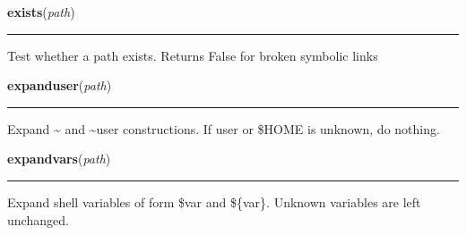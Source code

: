     \label{genericpath:exists}

    \vspace{0.5ex}

\hspace{.8\funcindent}\begin{boxedminipage}{\funcwidth}

    \raggedright \textbf{exists}(\textit{path})

    \vspace{-1.5ex}

    \rule{\textwidth}{0.5\fboxrule}
\setlength{\parskip}{2ex}
    Test whether a path exists.  Returns False for broken symbolic links

\setlength{\parskip}{1ex}
    \end{boxedminipage}

    \label{posixpath:expanduser}

    \vspace{0.5ex}

\hspace{.8\funcindent}\begin{boxedminipage}{\funcwidth}

    \raggedright \textbf{expanduser}(\textit{path})

    \vspace{-1.5ex}

    \rule{\textwidth}{0.5\fboxrule}
\setlength{\parskip}{2ex}
    Expand {\textasciitilde} and {\textasciitilde}user constructions.  If 
    user or \$HOME is unknown, do nothing.

\setlength{\parskip}{1ex}
    \end{boxedminipage}

    \label{posixpath:expandvars}

    \vspace{0.5ex}

\hspace{.8\funcindent}\begin{boxedminipage}{\funcwidth}

    \raggedright \textbf{expandvars}(\textit{path})

    \vspace{-1.5ex}

    \rule{\textwidth}{0.5\fboxrule}
\setlength{\parskip}{2ex}
    Expand shell variables of form \$var and \$\{var\}.  Unknown variables 
    are left unchanged.

\setlength{\parskip}{1ex}
    \end{boxedminipage}

